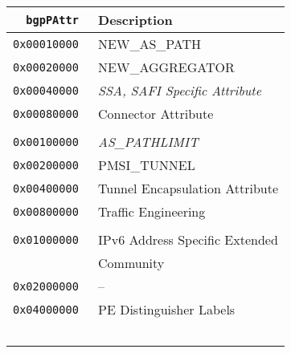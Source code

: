 \documentclass[documentation]{subfiles}
\begin{document}
\begin{minipage}{0.45\textwidth}
    \begin{longtable}{>{\tt}rl}
        \toprule
        {\bf bgpPAttr} & {\bf Description}\\
        \midrule\endhead%
        0x00010000 & NEW\_AS\_PATH\\
        0x00020000 & NEW\_AGGREGATOR\\
        0x00040000 & {\em SSA, SAFI Specific Attribute}\\ %
        0x00080000 & Connector Attribute\\
        \\
        0x00100000 & {\em AS\_PATHLIMIT}\\ %
        0x00200000 & PMSI\_TUNNEL\\
        0x00400000 & Tunnel Encapsulation Attribute\\
        0x00800000 & Traffic Engineering\\
        \\
        0x01000000 & IPv6 Address Specific Extended\\
                   & Community\\
        0x02000000 & --\\
        0x04000000 & PE Distinguisher Labels\\
        \\
        \\
        \\
        \\
        \\
        \bottomrule
    \end{longtable}
\end{minipage}
\end{document}

